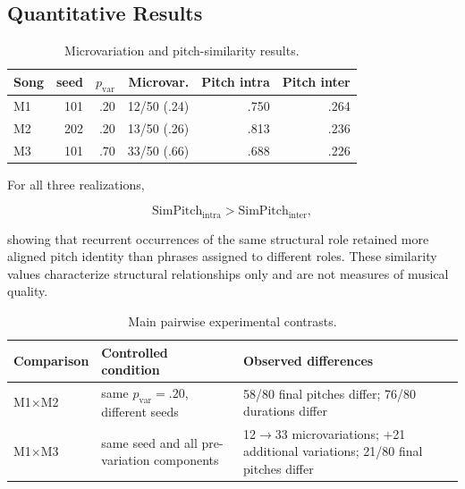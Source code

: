 \documentclass{article}
\begin{document}
\subsection{Quantitative Results}\label{subsec:quantitative_results}

\begin{table}[t]
  \centering
  \small
  \setlength{\tabcolsep}{3.2pt}
  \begin{tabular}{@{}lrrrrr@{}}
    \hline
    Song & seed & \(p_{\mathrm{var}}\) & Microvar. & Pitch intra & Pitch inter \\
    \hline
    M1 & 101 & .20 & 12/50 (.24) & .750 & .264 \\
    M2 & 202 & .20 & 13/50 (.26) & .813 & .236 \\
    M3 & 101 & .70 & 33/50 (.66) & .688 & .226 \\
    \hline
  \end{tabular}
  \caption{Microvariation and pitch-similarity results.}
  \label{tab:main_results}
\end{table}

For all three realizations,

\begin{equation}
\mathrm{SimPitch}_{\mathrm{intra}}>
\mathrm{SimPitch}_{\mathrm{inter}},
\end{equation}

showing that recurrent occurrences of the same structural role retained more aligned pitch identity than phrases assigned to different roles. These similarity values characterize structural relationships only and are not measures of musical quality.

\begin{table}[t]
  \centering
  \footnotesize
  \setlength{\tabcolsep}{2.5pt}
  \begin{tabular}{@{}p{}p{}p{}@{}}
    \hline
    Comparison & Controlled condition & Observed differences \\
    \hline
    M1$\times$M2 & same \(p_{\mathrm{var}}=.20\), different seeds & 58/80 final pitches differ; 76/80 durations differ \\
    M1$\times$M3 & same seed and all pre-variation components & 12$\rightarrow$33 microvariations; +21 additional variations; 21/80 final pitches differ \\
    \hline
  \end{tabular}
  \caption{Main pairwise experimental contrasts.}
  \label{tab:pairwise_results}
\end{table}
\end{document}
